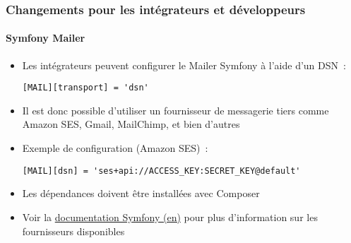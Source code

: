 %

\begin{frame}[fragile]
	\frametitle{Changements pour les intégrateurs et développeurs}
	\framesubtitle{Symfony Mailer}


	\begin{itemize}
		\item Les intégrateurs peuvent configurer le Mailer Symfony à l'aide d'un DSN~:
\begin{lstlisting}
[MAIL][transport] = 'dsn'
\end{lstlisting}
		\item Il est donc possible d'utiliser un fournisseur de messagerie tiers
			comme Amazon SES, Gmail, MailChimp, et bien d'autres
		\item Exemple de configuration (Amazon SES)~:
\begin{lstlisting}
[MAIL][dsn] = 'ses+api://ACCESS_KEY:SECRET_KEY@default'
\end{lstlisting}

		\item Les dépendances doivent être installées avec Composer
		\item Voir la \href{https://symfony.com/doc/current/mailer.html}{documentation Symfony (en)}
			pour plus d'information sur les fournisseurs disponibles
	\end{itemize}

\end{frame}


